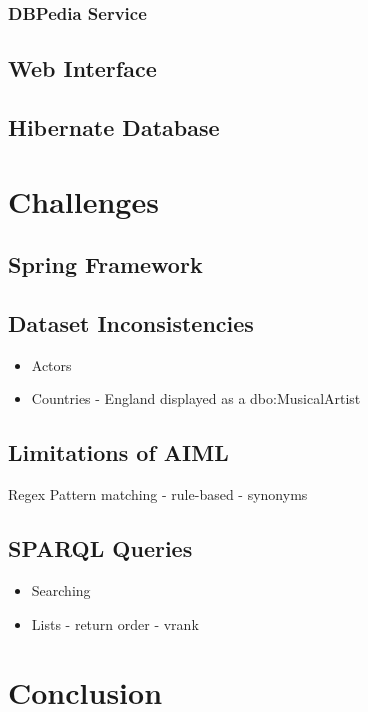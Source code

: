 \subsubsection{DBPedia Service}

\subsection{Web Interface}

\subsection{Hibernate Database}


\newpage
\section{Challenges}
\subsection{Spring Framework}

\subsection{Dataset Inconsistencies}
\begin{itemize}
	\item Actors 
	\item Countries - England displayed as a dbo:MusicalArtist
\end{itemize}

\subsection{Limitations of AIML}
Regex
Pattern matching - rule-based - synonyms

\subsection{SPARQL Queries}
\begin{itemize}
	\item Searching
	\item Lists - return order - vrank
\end{itemize}
\section{Conclusion}


